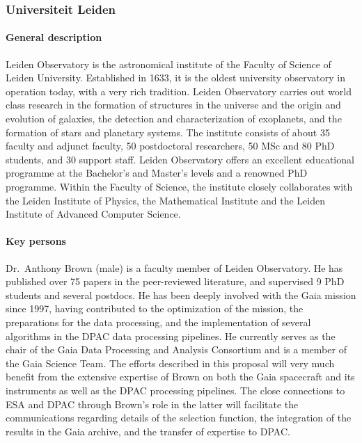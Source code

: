 \subsubsection{Universiteit Leiden}
\label{sec:ulei}

\paragraph{General description}
Leiden Observatory is the astronomical institute of the Faculty of Science of Leiden University. Established in 1633, it is the oldest university observatory in operation today, with a very rich tradition. Leiden Observatory carries out world class research in the formation of structures in the universe and the origin and evolution of galaxies, the detection and characterization of exoplanets, and the formation of stars and planetary systems. The institute consists of about 35 faculty and adjunct faculty, 50 postdoctoral researchers, 50 MSc and 80 PhD students, and 30 support staff. Leiden Observatory offers an excellent educational programme at the Bachelor’s and Master’s levels and a renowned PhD programme. Within the Faculty of Science, the institute closely collaborates with the Leiden Institute of Physics, the Mathematical Institute and the Leiden Institute of Advanced Computer Science.

\paragraph{Key persons}
Dr.~Anthony Brown (male) is a faculty member of Leiden Observatory. He has published over 75 papers in the peer-reviewed literature, and supervised 9 PhD students and several postdocs. He has been deeply involved with the Gaia mission since 1997, having contributed to the optimization of the mission, the preparations for the data processing, and the implementation of several algorithms in the DPAC data processing pipelines. He currently serves as the chair of the Gaia Data Processing and Analysis Consortium and is a member of the Gaia Science Team. The efforts described in this proposal will very much benefit from the extensive expertise of Brown on both the Gaia spacecraft and its instruments as well as the DPAC processing pipelines. The close connections to ESA and DPAC through Brown's role in the latter will facilitate the communications regarding details of the selection function, the integration of the results in the Gaia archive, and the transfer of expertise to DPAC.

